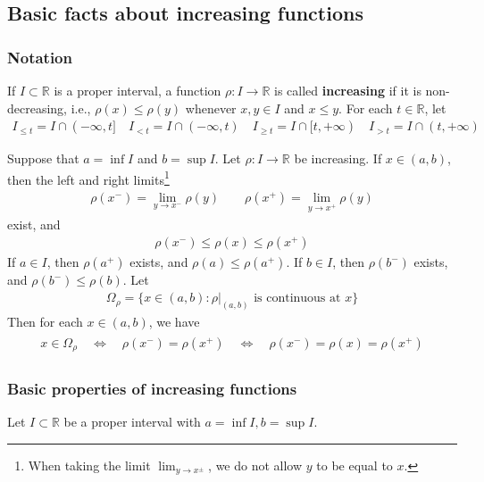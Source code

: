 \documentclass[12pt,b5paper,notitlepage]{article}
\theoremstyle{definition}
\theoremstyle{plain}
\newcommand{\Rbb}{\mathbb R}
\numberwithin{equation}{section}
\begin{document}
\subsection{Basic facts about increasing functions}\label{lb88}

\subsubsection{Notation}\label{lb89}

If $I\subset\Rbb$ is a proper interval, a function $\rho:I\rightarrow\Rbb$ is called \textbf{increasing} if it is non-decreasing, i.e., $\rho(x)\leq \rho(y)$ whenever $x,y\in I$ and $x\leq y$. For each $t\in\Rbb$, let
\begin{align*}
I_{\leq t}=I\cap (-\infty,t]\quad I_{<t}=I\cap (-\infty,t)\quad I_{\geq t}=I\cap [t,+\infty)\quad I_{>t}=I\cap (t,+\infty)
\end{align*}

Suppose that $a=\inf I$ and $b=\sup I$. Let $\rho:I\rightarrow \Rbb$ be increasing. If $x\in(a,b)$, then the left and right limits\footnote{When taking the limit $\lim_{y\rightarrow x^\pm}$, we do not allow $y$ to be equal to $x$.}
\begin{align}
\rho(x^-)=\lim_{y\rightarrow x^-}\rho(y)\qquad \rho(x^+)=\lim_{y\rightarrow x^+}\rho(y)
\end{align}
exist, and
\begin{align*}
\rho(x^-)\leq \rho(x)\leq \rho(x^+)
\end{align*}
If $a\in I$, then $\rho(a^+)$ exists, and $\rho(a)\leq \rho(a^+)$. If $b\in I$, then $\rho(b^-)$ exists, and $\rho(b^-)\leq \rho(b)$. Let
\begin{align*}
\Omega_\rho=\{x\in (a,b):\rho|_{(a,b)}\text{ is continuous at }x\}
\end{align*}
Then for each $x\in (a,b)$, we have
\begin{gather}\label{eq38}
\begin{gathered}
x\in\Omega_\rho\quad\Leftrightarrow\quad \rho(x^-)=\rho(x^+) \quad\Leftrightarrow\quad \rho(x^-)=\rho(x)=\rho(x^+)
\end{gathered}
\end{gather}


\subsubsection{Basic properties of increasing functions}

Let $I\subset\Rbb$ be a proper interval with $a=\inf I,b=\sup I$.
\end{document}
